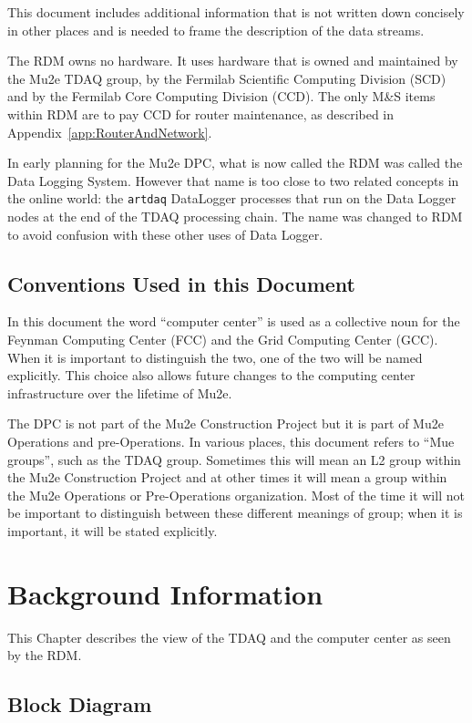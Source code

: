 This document includes additional information that is not written down concisely
in other places and is needed to frame the description of the data streams.


The RDM owns no hardware.  It uses hardware that is owned and maintained
by the Mu2e TDAQ group,
by the Fermilab Scientific Computing Division (SCD)
and by the Fermilab Core Computing Division (CCD).
The only M\&S items within RDM are to pay CCD for router maintenance,
as described in Appendix~\ref{app:RouterAndNetwork}.

In early planning for the Mu2e DPC, what is now called the RDM was called the Data Logging System.
However that name is too close to two related concepts in the online world:
the {\tt artdaq} DataLogger processes that run on the Data Logger nodes at the end of the TDAQ
processing chain.  The name was changed to RDM to avoid confusion with these other uses of Data Logger.

\section{Conventions Used in this Document}

In this document the word ``computer center'' is used as a collective noun for the
Feynman Computing Center (FCC) and the Grid Computing Center (GCC).
When it is important to distinguish the two, one of the two will be named explicitly.
This choice also allows future changes to the computing center infrastructure over the
lifetime of Mu2e.

The DPC is not part of the Mu2e Construction Project but it is part of Mu2e Operations
and pre-Operations.
In various places, this document refers to ``Mue groups'', such as the TDAQ group.
Sometimes this will mean an L2 group within the Mu2e Construction Project and at other
times it will mean a group within the Mu2e Operations or Pre-Operations organization.
Most of the time it will not be important to distinguish between these different meanings
of group; when it is important, it will be stated explicitly.


\chapter{Background Information}
\label{chap:BackgroundInfo}
This Chapter describes the view of the TDAQ and the computer center as seen by the RDM.

\section{Block Diagram}
\label{sec:BlockDiagram}

